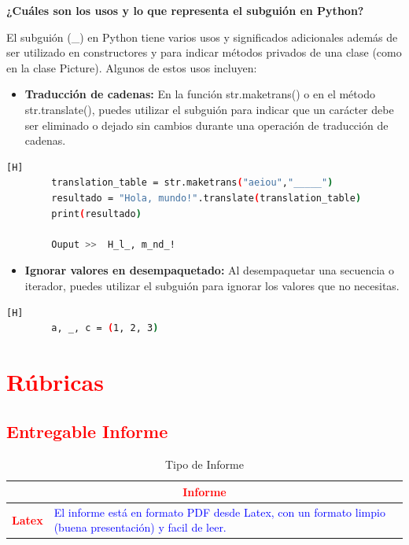 \documentclass{article}
\begin{document}
	\textbf{¿Cuáles son los usos y lo que representa el subguión en Python?}
	
	\vspace{0.3cm}
	El subguión (\_) en Python tiene varios usos y significados adicionales además de ser utilizado en constructores y para indicar métodos privados de una clase (como en la clase Picture). Algunos de estos usos incluyen:
	
	\begin{itemize}
		\item \textbf{Traducción de cadenas:} En la función str.maketrans() o en el método str.translate(), puedes utilizar el subguión para indicar que un carácter debe ser eliminado o dejado sin cambios durante una operación de traducción de cadenas.
	\end{itemize}
	
	\begin{lstlisting}[language=bash,caption={Ejemplo}][H]
		translation_table = str.maketrans("aeiou","_____")
		resultado = "Hola, mundo!".translate(translation_table)
		print(resultado)			
		
		Ouput >>  H_l_, m_nd_!
	\end{lstlisting}		
	
	\begin{itemize}
		\item \textbf{Ignorar valores en desempaquetado:} Al desempaquetar una secuencia o iterador, puedes utilizar el subguión para ignorar los valores que no necesitas. 
	\end{itemize}
	
	\begin{lstlisting}[language=bash,caption={Ejemplo}][H]
		a, _, c = (1, 2, 3)
	\end{lstlisting}	
	
	\vspace{0.3cm}
	
	\clearpage
	
	\section{\textcolor{red}{Rúbricas}}
	
	\subsection{\textcolor{red}{Entregable Informe}}
	\begin{table}[H]
		\caption{Tipo de Informe}
		\setlength{\tabcolsep}{0.5em} %
		{\renewcommand{\arraystretch}{1.5}%
			\begin{tabular}{|p{3cm}|p{12cm}|}
				\hline
				\multicolumn{2}{|c|}{\textbf{\textcolor{red}{Informe}}}  \\
				\hline 
				\textbf{\textcolor{red}{Latex}} & \textcolor{blue}{El informe está en formato PDF desde Latex,  con un formato limpio (buena presentación) y facil de leer.}   \\ 
				\hline 
				
				
			\end{tabular}
		}
	\end{table}
	
\end{document}

